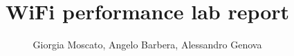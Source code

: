 \documentclass[sigconf]{acmart}
\begin{document}
\linenumbers
\fancyhead{}
\def\thetitle{WiFi performance lab report}
\title{\thetitle}

\author{Giorgia Moscato, Angelo Barbera, Alessandro Genova}

\date{}


\acmPrice{}
\acmISBN{}
\acmDOI{}

\maketitle
{}

 




\newpage




\end{document}

